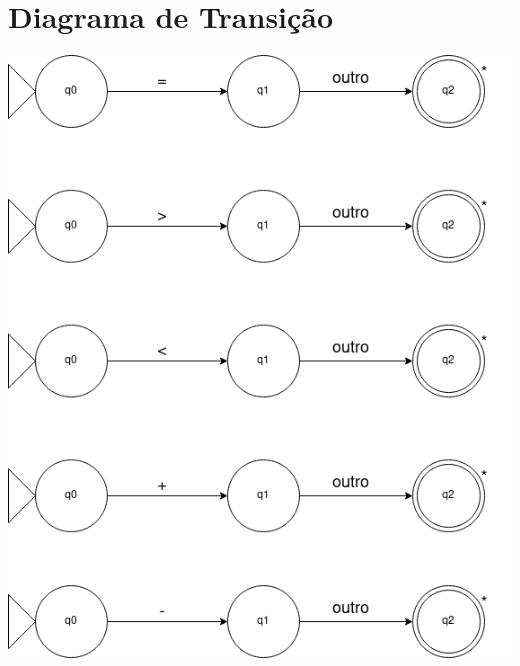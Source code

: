 \documentclass[
	12pt,				%
	openright,			%
	twoside,			%
	a4paper,			%
	english,			%
	french,				%
	spanish,			%
	brazil				%
	]{abntex2}
\begin{document}

\chapter{Diagrama de Transição}
\includegraphics[scale=0.7]{1.png}
\\
\\
\end{document}
